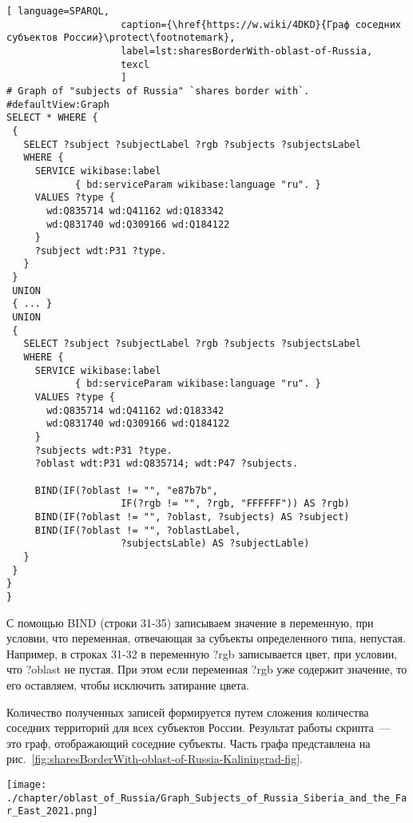 \lstset{numbers=left, firstnumber=1, frame=single}
\begin{lstlisting}[ language=SPARQL, 
                    caption={\href{https://w.wiki/4DKD}{Граф соседних субъектов России}\protect\footnotemark},
                    label=lst:sharesBorderWith-oblast-of-Russia,
                    texcl 
                    ]
# Graph of "subjects of Russia" `shares border with`. 
#defaultView:Graph
SELECT * WHERE {
 {
   SELECT ?subject ?subjectLabel ?rgb ?subjects ?subjectsLabel 
   WHERE {
     SERVICE wikibase:label 
            { bd:serviceParam wikibase:language "ru". }
     VALUES ?type {
       wd:Q835714 wd:Q41162 wd:Q183342
       wd:Q831740 wd:Q309166 wd:Q184122
     }
     ?subject wdt:P31 ?type.
   }
 }
 UNION
 { ... }
 UNION
 {
   SELECT ?subject ?subjectLabel ?rgb ?subjects ?subjectsLabel 
   WHERE {
     SERVICE wikibase:label 
            { bd:serviceParam wikibase:language "ru". }
     VALUES ?type {
       wd:Q835714 wd:Q41162 wd:Q183342
       wd:Q831740 wd:Q309166 wd:Q184122
     }
     ?subjects wdt:P31 ?type.
     ?oblast wdt:P31 wd:Q835714; wdt:P47 ?subjects.
     
     BIND(IF(?oblast != "", "e87b7b", 
                    IF(?rgb != "", ?rgb, "FFFFFF")) AS ?rgb)
     BIND(IF(?oblast != "", ?oblast, ?subjects) AS ?subject)
     BIND(IF(?oblast != "", ?oblastLabel, 
                    ?subjectsLable) AS ?subjectLable)
   }
 }
}
}
\end{lstlisting}%

С помощью BIND (строки 31-35) записываем значение в переменную, при условии, что переменная, отвечающая за субъекты определенного типа, непустая. Например, в строках 31-32 в переменную ?rgb записывается цвет, при условии, что ?oblast не пустая. При этом если переменная ?rgb уже содержит значение, то его оставляем, чтобы исключить затирание цвета.

Количество полученных записей формируется путем сложения количества соседних территорий для всех субъектов России. Результат работы скрипта~--- это граф, отображающий соседние субъекты. Часть графа представлена на рис.~\ref{fig:sharesBorderWith-oblast-of-Russia-Kaliningrad-fig}.

\begin{fullwidth}
\begin{figure*}[h]
	\texttt{[image: ./chapter/oblast\_of\_Russia/Graph\_Subjects\_of\_Russia\_Siberia\_and\_the\_Far\_East\_2021.png]}
	\caption[Граф субъектов России. Калининград, 2021.]{Регионы России в Сибире и Дальнем востоке,202. Фрагмент графа соседние субъекты России, построенного по скрипту~\protect\ref{lst:sharesBorderWith-oblast-of-Russia}.
	Республики - вершины зеленого цвета (Якутия).
	Автономные округа- вершины фиолетового цвета (Чукотский автономный округ).
	Края- вершины голубого цвета (Хабаровский край).
	Области - вершины розового цвета (Амурская область).
	Автономные области - вершины салатового цвета (Еврейская автономная область).}%
      \label{fig:sharesBorderWith-oblast-of-Russia-Kaliningrad-fig}%
\end{figure*} 
\end{fullwidth}

